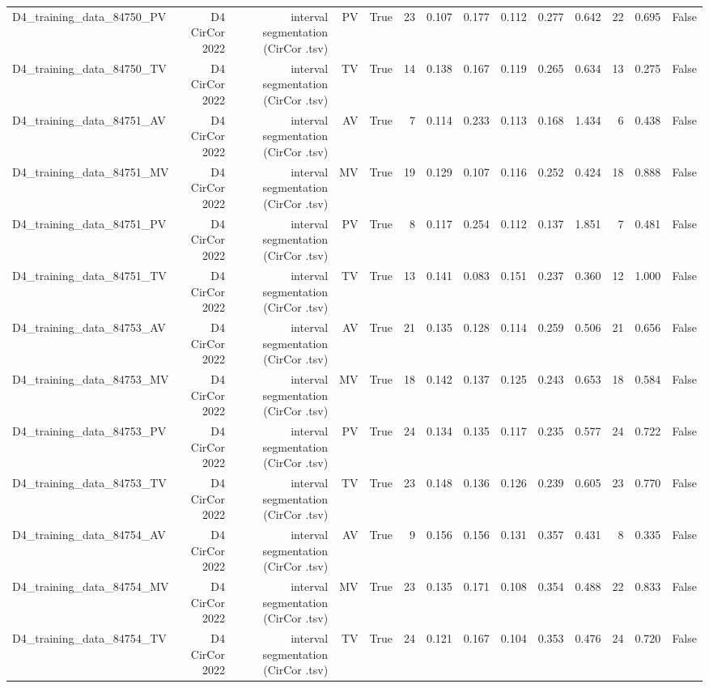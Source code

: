 \begin{table}[htbp]
\begin{tabular}{lrrrrrrrrrrrrr}
    D4\_training\_data\_84750\_PV & D4 CirCor 2022 & interval segmentation (CirCor .tsv) & PV & True & 23 & 0.107 & 0.177 & 0.112 & 0.277 & 0.642 & 22 & 0.695 & False \\
    D4\_training\_data\_84750\_TV & D4 CirCor 2022 & interval segmentation (CirCor .tsv) & TV & True & 14 & 0.138 & 0.167 & 0.119 & 0.265 & 0.634 & 13 & 0.275 & False \\
    D4\_training\_data\_84751\_AV & D4 CirCor 2022 & interval segmentation (CirCor .tsv) & AV & True & 7 & 0.114 & 0.233 & 0.113 & 0.168 & 1.434 & 6 & 0.438 & False \\
    D4\_training\_data\_84751\_MV & D4 CirCor 2022 & interval segmentation (CirCor .tsv) & MV & True & 19 & 0.129 & 0.107 & 0.116 & 0.252 & 0.424 & 18 & 0.888 & False \\
    D4\_training\_data\_84751\_PV & D4 CirCor 2022 & interval segmentation (CirCor .tsv) & PV & True & 8 & 0.117 & 0.254 & 0.112 & 0.137 & 1.851 & 7 & 0.481 & False \\
    D4\_training\_data\_84751\_TV & D4 CirCor 2022 & interval segmentation (CirCor .tsv) & TV & True & 13 & 0.141 & 0.083 & 0.151 & 0.237 & 0.360 & 12 & 1.000 & False \\
    D4\_training\_data\_84753\_AV & D4 CirCor 2022 & interval segmentation (CirCor .tsv) & AV & True & 21 & 0.135 & 0.128 & 0.114 & 0.259 & 0.506 & 21 & 0.656 & False \\
    D4\_training\_data\_84753\_MV & D4 CirCor 2022 & interval segmentation (CirCor .tsv) & MV & True & 18 & 0.142 & 0.137 & 0.125 & 0.243 & 0.653 & 18 & 0.584 & False \\
    D4\_training\_data\_84753\_PV & D4 CirCor 2022 & interval segmentation (CirCor .tsv) & PV & True & 24 & 0.134 & 0.135 & 0.117 & 0.235 & 0.577 & 24 & 0.722 & False \\
    D4\_training\_data\_84753\_TV & D4 CirCor 2022 & interval segmentation (CirCor .tsv) & TV & True & 23 & 0.148 & 0.136 & 0.126 & 0.239 & 0.605 & 23 & 0.770 & False \\
    D4\_training\_data\_84754\_AV & D4 CirCor 2022 & interval segmentation (CirCor .tsv) & AV & True & 9 & 0.156 & 0.156 & 0.131 & 0.357 & 0.431 & 8 & 0.335 & False \\
    D4\_training\_data\_84754\_MV & D4 CirCor 2022 & interval segmentation (CirCor .tsv) & MV & True & 23 & 0.135 & 0.171 & 0.108 & 0.354 & 0.488 & 22 & 0.833 & False \\
    D4\_training\_data\_84754\_TV & D4 CirCor 2022 & interval segmentation (CirCor .tsv) & TV & True & 24 & 0.121 & 0.167 & 0.104 & 0.353 & 0.476 & 24 & 0.720 & False \\

\end{tabular}
\end{table}
